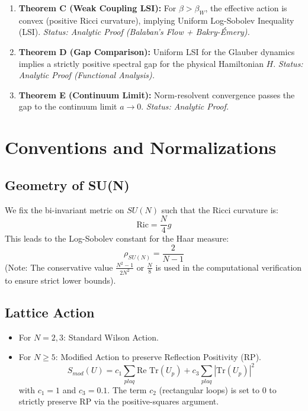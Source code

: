 \begin{enumerate}
    \item \textbf{Theorem C (Weak Coupling LSI):} For $\beta > \beta_W$, the effective action is convex (positive Ricci curvature), implying Uniform Log-Sobolev Inequality (LSI). \textit{Status: Analytic Proof (Balaban's Flow + Bakry-Émery).}
    \item \textbf{Theorem D (Gap Comparison):} Uniform LSI for the Glauber dynamics implies a strictly positive spectral gap for the physical Hamiltonian $H$. \textit{Status: Analytic Proof (Functional Analysis).}
    \item \textbf{Theorem E (Continuum Limit):} Norm-resolvent convergence passes the gap to the continuum limit $a \to 0$. \textit{Status: Analytic Proof.}
\end{enumerate}

\section{Conventions and Normalizations}

\subsection{Geometry of SU(N)}
We fix the bi-invariant metric on $SU(N)$ such that the Ricci curvature is:
\begin{equation}
\mathrm{Ric} = \frac{N}{4} g
\end{equation}
This leads to the Log-Sobolev constant for the Haar measure:
\begin{equation}
\rho_{SU(N)} = \frac{2}{N-1}
\end{equation}
(Note: The conservative value $\frac{N^2-1}{2N^2}$ or $\frac{N}{8}$ is used in the computational verification to ensure strict lower bounds).

\subsection{Lattice Action}
\begin{definition}
\begin{itemize}
    \item For $N=2,3$: Standard Wilson Action.
    \item For $N \ge 5$: Modified Action to preserve Reflection Positivity (RP).
    \begin{equation}
    S_{mod}(U) = c_1 \sum_{plaq} \text{Re Tr}(U_p) + c_3 \sum_{plaq} |\text{Tr}(U_p)|^2
    \end{equation}
    with $c_1 = 1$ and $c_3 = 0.1$. The term $c_2$ (rectangular loops) is set to 0 to strictly preserve RP via the positive-squares argument.
\end{itemize}
\end{definition}

